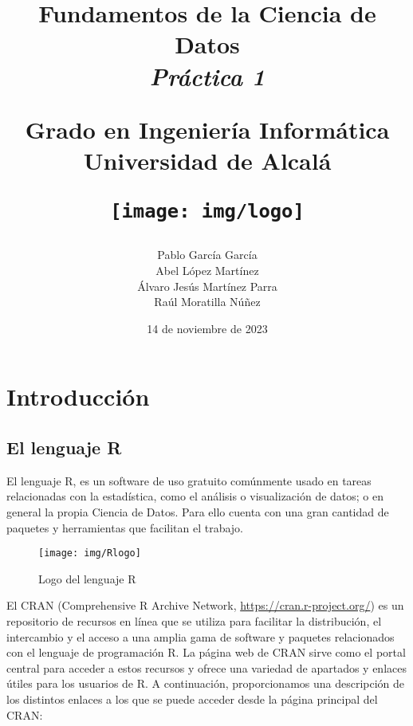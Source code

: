 \documentclass[12pt]{report}\usepackage[]{graphicx}\usepackage[dvipsnames]{xcolor}
\title{
	\huge
	\noindent\textbf{Fundamentos de la Ciencia de Datos}\\
	
	{\Large \textit{Práctica 1}}
	\vspace{1cm}
	
	\huge
	Grado en Ingeniería Informática\\
	Universidad de Alcalá\\
	
	\vspace{1cm}
	
	\texttt{[image: img/logo]}
}
\author{
	Pablo García García\\
	Abel López Martínez\\
	Álvaro Jesús Martínez Parra\\
	Raúl Moratilla Núñez
}
\date{
	\large{14 de noviembre de 2023}
}
\begin{document}
	
	\renewcommand{\chaptername}{Parte}
	\renewcommand{\lstlistingname}{Código}
	\maketitle \thispagestyle{empty}
	
	\newpage
	
	\setcounter{tocdepth}{3}
	\tableofcontents
	\listoffigures
	
	\chapter*{Introducción}\pagestyle{plain}
	
		\section*{El lenguaje R}
		
			El lenguaje R, es un software de uso gratuito comúnmente usado en tareas relacionadas con la estadística, como el análisis o visualización de datos; o en general la propia Ciencia de Datos. Para ello cuenta con una gran cantidad de paquetes y herramientas que facilitan el trabajo.  
			
			\begin{figure}[H]
				\centering
				\texttt{[image: img/Rlogo]}
				\caption{Logo del lenguaje R}
				\label{fig:logo_R}
			\end{figure}
		
			El CRAN (Comprehensive R Archive Network, \url{https://cran.r-project.org/}) es un repositorio de recursos en línea que se utiliza para facilitar la distribución, el intercambio y el acceso a una amplia gama de software y paquetes relacionados con el lenguaje de programación R. La página web de CRAN sirve como el portal central para acceder a estos recursos y ofrece una variedad de apartados y enlaces útiles para los usuarios de R. A continuación, proporcionamos una descripción de los distintos enlaces a los que se puede acceder desde la página principal del CRAN: 
			
\end{document}
